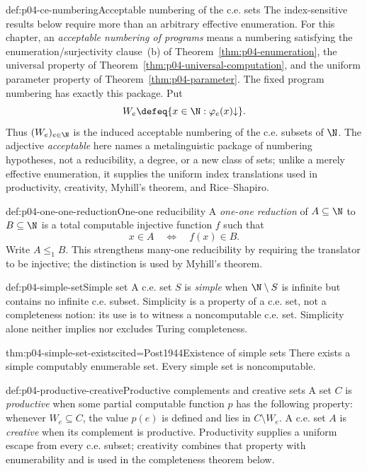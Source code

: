 \begin{hbconvention}{def:p04-ce-numbering}{Acceptable numbering of the c.e. sets}
The index-sensitive results below require more than an arbitrary effective
enumeration.  For this chapter, an \emph{acceptable numbering of programs}
means a numbering satisfying the enumeration/surjectivity clause~(b) of
Theorem~\ref{thm:p04-enumeration}, the universal property of
Theorem~\ref{thm:p04-universal-computation}, and the uniform parameter
property of Theorem~\ref{thm:p04-parameter}.  The fixed program numbering has
exactly this package.  Put
\[
 W_e\defeq\{x\in\N:\varphi_e(x)\mathord\downarrow\}.
\]
Thus \((W_e)_{e\in\N}\) is the induced acceptable numbering of the c.e.
subsets of \(\N\).  The adjective \emph{acceptable} here names a
metalinguistic package of numbering hypotheses, not a reducibility, a degree,
or a new class of sets; unlike a merely effective enumeration, it supplies
the uniform index translations used in productivity, creativity, Myhill's
theorem, and Rice--Shapiro.
\end{hbconvention}

\begin{hbdefinition}{def:p04-one-one-reduction}{One-one reducibility}
A \emph{one-one reduction} of \(A\subseteq\N\) to \(B\subseteq\N\) is a
total computable injective function \(f\) such that
\[
 x\in A\quad\Leftrightarrow\quad f(x)\in B.
\]
Write \(A\leq_1B\).  This strengthens many-one reducibility by requiring the
translator to be injective; the distinction is used by Myhill's theorem.
\end{hbdefinition}

\begin{hbdefinition}{def:p04-simple-set}{Simple set}
A c.e. set \(S\) is \emph{simple} when \(\N\setminus S\) is infinite but
contains no infinite c.e. subset.  Simplicity is a property of a c.e. set,
not a completeness notion: its use is to witness a noncomputable c.e. set.
Simplicity alone neither implies nor excludes Turing completeness.
\end{hbdefinition}

\begin{hbtheorem}{thm:p04-simple-set-exists}{cited=Post1944}{Existence of simple sets}
There exists a simple computably enumerable set.  Every simple set is
noncomputable.
\end{hbtheorem}

\begin{hbdefinition}{def:p04-productive-creative}{Productive complements and creative sets}
A set \(C\) is \emph{productive} when some partial computable function \(p\)
has the following property: whenever \(W_e\subseteq C\), the value \(p(e)\)
is defined and lies in \(C\setminus W_e\).  A c.e. set \(A\) is
\emph{creative} when its complement is productive.
Productivity supplies a uniform escape from every c.e. subset; creativity
combines that property with enumerability and is used in the completeness
theorem below.
\end{hbdefinition}

